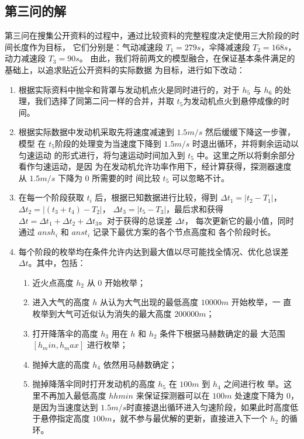 \documentclass[hyperref,a4paper,UTF8]{ctexart}
\begin{document}
\subsection{第三问的解}
第三问在搜集公开资料的过程中，通过比较资料的完整程度决定使用三大阶段的时间长度作为目标，
它们分别是：气动减速段 $T_1 = 279s$，伞降减速段 $T_2=168s$，动力减速段 $T_3=90s$​。
由此，我们将前两文的模型融合，在保证基本条件满足的基础上，以追求贴近公开资料的实际数据
为目标，进行如下改动：
\begin{enumerate}
    \item 根据实际资料中抛伞和背罩与发动机点火是同时进行的，对于 $h_5$ 与 $h_6$ 的处
    理，我们选择了同第二问一样的合并，并取 $t_5$​​​ 为发动机点火到悬停成像的时间。
    \item 根据实际数据中发动机采取先将速度减速到 $1.5m/s$ 然后缓缓下降这一步骤，模型
    在 $t_5$ ​阶段的处理变为当速度下降到 $1.5m/s$ 时退出循环，并将剩余运动以匀速运动
    的形式进行，将匀速运动时间加入到 $t_5$ 中。这里之所以将剩余部分看作匀速运动，是因
    为在发动机允许功率作用下，经计算获得，探测器速度从 $1.5m/s$ 下降为 $0$ 所需要的时
    间比较 $t_5$ 可以忽略不计。
    \item 在每一个阶段获取 $t_i$ 后，根据已知数据进行比较，得到
    $\Delta t_1 = |t_2 - T_1|$，$\Delta t_2 = |(t_3+t_4) - T_2|$，
    $\Delta t_3 = |t_5 - T_3|$，最后求和获得
    $\Delta t = \Delta t_1 + \Delta t_2 + \Delta t_3$。对于获得的总误差 $\Delta t$，
    每次更新它的最小值，同时通过 $ansh_i$ 和 $anst_i$ 记录下最优方案的各个节点高度和
    各个阶段时长。
    \item 每个阶段的枚举均在条件允许内达到最大值以尽可能找全情况、优化总误差
    $\Delta t$。其中，包括：
        \begin{enumerate}
            \item 近火点高度 $h_2$ 从 $0$ 开始枚举；
            \item 进入大气的高度 $h$ 从认为大气出现的最低高度 $10000m$ 开始枚举，一
            直枚举到大气可近似认为消失的最大高度 $200000m$；
            \item 打开降落伞的高度 $h_3$ 用在 $h$ 和 $h_2$ 条件下根据马赫数确定的最
            大范围 $[h_min,h_max]$ 进行枚举；
            \item 抛掉大底的高度 $h_4$ 依然用马赫数确定；
            \item 抛掉降落伞同时打开发动机的高度 $h_5$ 在 $100m$ 到 $h_4$ 之间进行枚
            举。这里不再加入最低高度 $hhmin$ 来保证探测器可以在 $100m$ 处速度下降为
            $0$，是因为当速度达到 $1.5m/s$ ​时直接退出循环进入匀速阶段，如果此时高度低
            于悬停指定高度 $100m$，就不参与最优解的更新，直接进入下一个 $h_2$ 的循环。
        \end{enumerate}
\end{enumerate}
\end{document}
